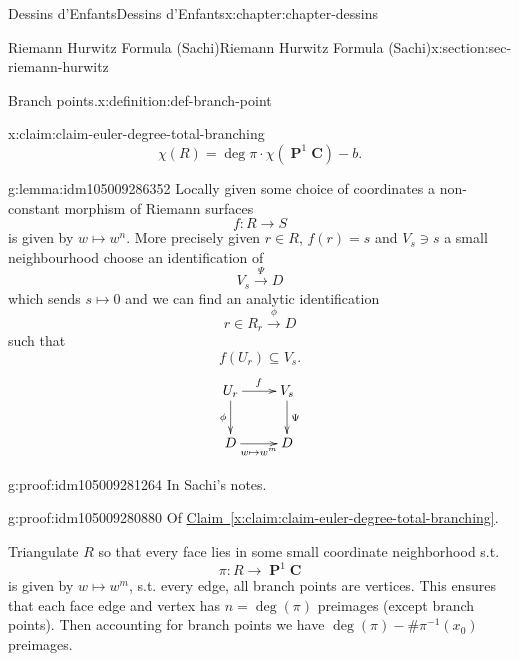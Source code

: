 \documentclass[oneside,10pt,]{book}
\numberwithin{equation}{section}
\newcommand{\inv}{^{-1}}
\newcommand{\CC}{\mathbf{C}}
\DeclareMathOperator{\PP}{\mathbf{P}}
\begin{document}
\begin{chapterptx}{Dessins d'Enfants}{}{Dessins d'Enfants}{}{}{x:chapter:chapter-dessins}
\begin{sectionptx}{Riemann Hurwitz Formula (Sachi)}{}{Riemann Hurwitz Formula (Sachi)}{}{}{x:section:sec-riemann-hurwitz}
\begin{definition}{Branch points.}{x:definition:def-branch-point}
\begin{equation*}
\end{equation*}
%
\end{definition}
\begin{claim}{}{}{x:claim:claim-euler-degree-total-branching}%
%
\begin{equation*}
\chi(R) = \deg \pi \cdot \chi(\PP^1\CC)  - b\text{.}
\end{equation*}
%
\end{claim}
\begin{lemma}{}{}{g:lemma:idm105009286352}%
Locally given some choice of coordinates a non-constant morphism of Riemann surfaces%
\begin{equation*}
f\colon R \to S
\end{equation*}
is given by \(w\mapsto w^n\). More precisely given \(r \in R\), \(f(r) = s\) and \(V_s \ni s\) a small neighbourhood choose an identification of%
\begin{equation*}
V_s \xrightarrow \Psi D
\end{equation*}
which sends \(s \mapsto 0\) and we can find an analytic identification%
\begin{equation*}
r\in R_r \xrightarrow \phi D
\end{equation*}
such that%
\begin{equation*}
f(U_r) \subseteq V_s\text{.}
\end{equation*}
%
\begin{equation*}
\xymatrix{U_r \ar[r]^f \ar[d]_\phi & V_s \ar[d]^\Psi \\ D \ar[r]_{w\mapsto w^m} & D}
\end{equation*}
%
\end{lemma}
\begin{proofptx}{}{g:proof:idm105009281264}
In Sachi's notes.%
\end{proofptx}
\begin{proofptx}{}{g:proof:idm105009280880}
Of \hyperref[x:claim:claim-euler-degree-total-branching]{Claim~\ref{x:claim:claim-euler-degree-total-branching}}.%
\par
Triangulate \(R\) so that every face lies in some small coordinate neighborhood s.t.%
\begin{equation*}
\pi \colon R\to \PP^1 \CC
\end{equation*}
is given by \(w \mapsto w^m\), s.t. every edge, all branch points are vertices. This ensures that each face edge and vertex has \(n  = \deg (\pi)\) preimages (except branch points). Then accounting for branch points we have \(\deg(\pi) -  \# \pi\inv (x_0)\) preimages.%
\end{proofptx}

\end{sectionptx}
\end{chapterptx}
\end{document}
